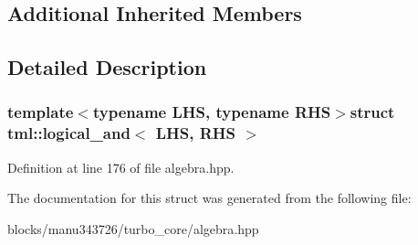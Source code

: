\subsection*{Additional Inherited Members}


\subsection{Detailed Description}
\subsubsection*{template$<$typename L\+H\+S, typename R\+H\+S$>$struct tml\+::logical\+\_\+and$<$ L\+H\+S, R\+H\+S $>$}



Definition at line 176 of file algebra.\+hpp.



The documentation for this struct was generated from the following file\+:\begin{DoxyCompactItemize}
\item 
blocks/manu343726/turbo\+\_\+core/algebra.\+hpp\end{DoxyCompactItemize}
